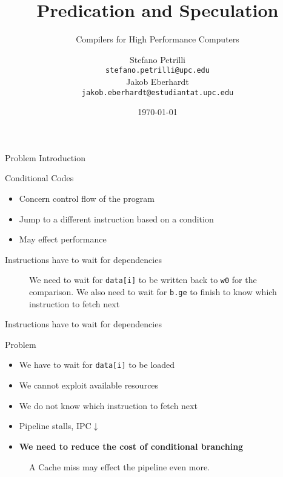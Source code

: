 \documentclass[presentation]{beamer}
\title{Predication and Speculation}%
\subtitle{Compilers for High Performance Computers}%
\author{Stefano Petrilli\\ \texttt{stefano.petrilli@upc.edu}\\[1ex] %
  Jakob Eberhardt\\ \texttt{jakob.eberhardt@estudiantat.upc.edu}}
\date{\today{}}
\begin{document}
\frame{\titlepage}

\begin{frame}[fragile]{Problem Introduction}
    
    \label{lst:baseline_c} 
\begin{block}{Conditional Codes}
    \begin{itemize}
        \item Concern control flow of the program
        \item Jump to a different instruction based on a condition
        \item May effect performance
    \end{itemize}
\end{block}
\end{frame}

\begin{frame}[fragile]{Instructions have to wait for dependencies}
    \begin{center}
        \resizebox{0.75\textwidth}{!}{
            
        }
    \end{center}
    
    \vspace{0cm}
    \begin{figure}
        \centering
        \resizebox{0.73\textwidth}{!}{
        }
        \caption{We need to wait for \texttt{data[i]} to be written back to \texttt{w0} for the comparison. We also need to wait for \texttt{b.ge} to finish to know which instruction to fetch next}
        \label{fig:pipeline-stages}
    \end{figure}
\end{frame}


\begin{frame}[fragile]{Instructions have to wait for dependencies}
    \begin{block}{Problem}
        \begin{itemize}
            \item We have to wait for \texttt{data[i]} to be loaded
            \item We cannot exploit available resources 
            \item We do not know which instruction to fetch next
            \item Pipeline stalls, IPC$\downarrow$
            \item \textbf{We need to reduce the cost of conditional branching}
        \end{itemize}
        \end{block}
    \vspace{0cm}
    \begin{figure}
        \centering
        \resizebox{\linewidth}{!}{
            
        }
        \caption{A Cache miss may effect the pipeline even more.}
        \label{fig:pipeline-diagram}
    \end{figure}

\end{frame}
\end{document}
